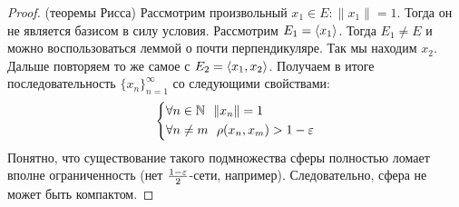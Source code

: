 \begin{proof} (теоремы Рисса)
	Рассмотрим произвольный $x_1 \in E\colon \|x_1\| = 1$. Тогда он не является базисом в силу условия. Рассмотрим $E_1 = \left\langle x_1\right\rangle$. Тогда $E_1 \neq E$ и можно воспользоваться леммой о почти перпендикуляре. Так мы находим $x_2$. Дальше повторяем то же самое с $E_2 = \left\langle x_1, x_2\right\rangle$. Получаем в итоге последовательность $\{x_n\}_{n = 1}^\infty$ со следующими свойствами:
	\[
		\left\{ \begin{aligned} 
			&{\forall n \in \mathbb{N}\ \ \|x_n\| = 1}
			\\
			&{\forall n \neq m\ \ \rho(x_n, x_m) > 1 - \varepsilon}
		 \end{aligned} \right.
	\]
	Понятно, что существование такого подмножества сферы полностью ломает вполне ограниченность (нет $\frac{1 - \varepsilon}{2}$-сети, например). Следовательно, сфера не может быть компактом.
\end{proof}
